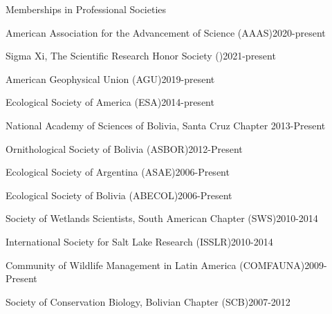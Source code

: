 \documentclass{resume} %
\begin{document}
\begin{rSection}{Memberships in Professional Societies}

\normalfont

\begin{esSubsection}{American Association for the Advancement of Science }{(AAAS)}{2020-present}{}{}
\end{esSubsection}

\begin{esSubsection}{Sigma Xi, The Scientific Research Honor Society }{(\textSigma  \textXi)}{2021-present}{}{}
\end{esSubsection}

\begin{esSubsection}{American Geophysical Union }{(AGU)}{2019-present}{}{}
\end{esSubsection}

\begin{esSubsection}{Ecological Society of America }{(ESA)}{2014-present}{}{}
\end{esSubsection}

\begin{esSubsection}{National Academy of Sciences of Bolivia, Santa Cruz Chapter }{}{2013-Present}{}{}
\end{esSubsection}


\begin{esSubsection}{Ornithological Society of Bolivia }{(ASBOR)}{2012-Present}{}{}
\end{esSubsection}

\begin{esSubsection}{Ecological Society of Argentina }{(ASAE)}{2006-Present}{}{}
\end{esSubsection}

\begin{esSubsection}{Ecological Society of Bolivia }{(ABECOL)}{2006-Present}{}{}
\end{esSubsection}

\begin{esSubsection}{Society of Wetlands Scientists, South American Chapter }{(SWS)}{2010-2014}{}{}
\end{esSubsection}

\begin{esSubsection}{International Society for Salt Lake Research }{(ISSLR)}{2010-2014}{}{}
\end{esSubsection}

\begin{esSubsection}{Community of Wildlife Management in Latin America }{(COMFAUNA)}{2009-Present}{}{}
\end{esSubsection}

\begin{esSubsection}{Society of Conservation Biology, Bolivian Chapter }{(SCB)}{2007-2012}{}{}
\end{esSubsection}

\end{rSection}



\clearpage
\end{document}
